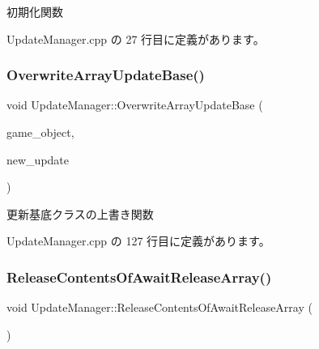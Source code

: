 初期化関数 



 Update\+Manager.\+cpp の 27 行目に定義があります。

\mbox{\label{class_update_manager_ab4f492c33ed941ddd01ccae8218080ff}} 
\subsubsection{\texorpdfstring{Overwrite\+Array\+Update\+Base()}{OverwriteArrayUpdateBase()}}
{\footnotesize\ttfamily void Update\+Manager\+::\+Overwrite\+Array\+Update\+Base (\begin{DoxyParamCaption}\item[{\mbox{\hyperlink{class_game_object_base}{Game\+Object\+Base}} $\ast$}]{game\+\_\+object,  }\item[{\mbox{\hyperlink{class_update_base}{Update\+Base}} $\ast$}]{new\+\_\+update }\end{DoxyParamCaption})}



更新基底クラスの上書き関数 



 Update\+Manager.\+cpp の 127 行目に定義があります。

\mbox{\label{class_update_manager_ac87db8037fbfb800187c50ca22a1f01d}} 
\subsubsection{\texorpdfstring{Release\+Contents\+Of\+Await\+Release\+Array()}{ReleaseContentsOfAwaitReleaseArray()}}
{\footnotesize\ttfamily void Update\+Manager\+::\+Release\+Contents\+Of\+Await\+Release\+Array (\begin{DoxyParamCaption}{ }\end{DoxyParamCaption})\hspace{0.3cm}{\ttfamily [private]}}



